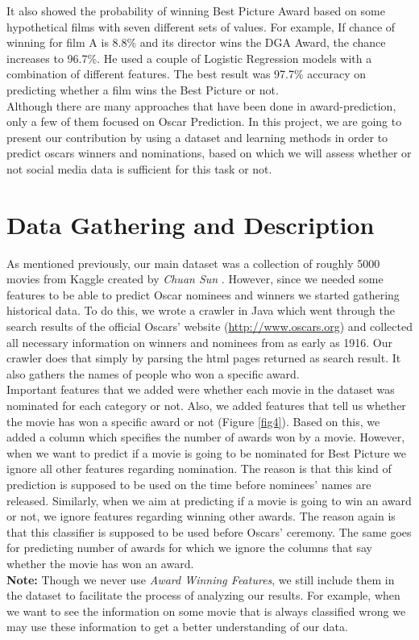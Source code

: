 \documentclass[journal,transmag]{IEEEtran}
\begin{document}
It also showed the probability of winning Best Picture Award based on some hypothetical films with seven different sets of values. For example, If chance of winning for film A is 8.8\% and its director wins the DGA Award, the chance increases to 96.7\%. He used a couple of Logistic Regression models with a combination of different features. The best result was 97.7\% accuracy on predicting whether a film wins the Best Picture or not.\\
Although there are many approaches that have been done in award-prediction, only a few of them focused on Oscar Prediction. In this project, we are going to present our contribution by using a dataset and learning methods in order to predict oscars winners and nominations, based on which we will assess whether or not social media data is sufficient for this task or not.
	
	
	\section{Data Gathering and Description}
As mentioned previously, our main dataset was a collection of roughly 5000 movies from Kaggle created by \emph{Chuan Sun} \cite{refCreator}. However, since we needed some features to be able to predict Oscar nominees and winners we started gathering historical data. To do this, we wrote a crawler in Java which went through the search results of the official Oscars' website (\url{http://www.oscars.org}) and collected all necessary information on winners and nominees from as early as 1916. Our crawler does that simply by parsing the html pages returned as search result. It also gathers the names of people who won a specific award.\\
Important features that we added were whether each movie in the dataset was nominated for each category or not. Also, we added features that tell us whether the movie has won a specific award or not (Figure \ref{fig4}). Based on this, we added a column which specifies the number of awards won by a movie. However, when we want to predict if a movie is going to be nominated for Best Picture we ignore all other features regarding nomination. The reason is that this kind of prediction is supposed to be used on the time before nominees' names are released. Similarly, when we aim at predicting if a movie is going to win an award or not, we ignore features regarding winning other awards. The reason again is that this classifier is supposed to be used before Oscars' ceremony. The same goes for predicting number of awards for which we ignore the columns that say whether the movie has won an award.\\
\textbf{Note:} Though we never use \emph{Award Winning Features}, we still include them in the dataset to facilitate the process of analyzing our results. For example, when we want to see the information on some movie that is always classified wrong we may use these information to get a better understanding of our data.\\
\end{document}
